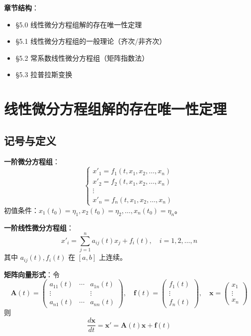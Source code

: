 \textbf{章节结构}：
\begin{itemize}
    \item \S 5.0 线性微分方程组解的存在唯一性定理
    \item \S 5.1 线性微分方程组的一般理论（齐次/非齐次）
    \item \S 5.2 常系数线性微分方程组（矩阵指数法）
    \item \S 5.3 拉普拉斯变换
\end{itemize}

\section{线性微分方程组解的存在唯一性定理}

\subsection{记号与定义}

\textbf{一阶微分方程组}：
$$\begin{cases} x'_1 = f_1(t, x_1, x_2, \ldots, x_n) \\ x'_2 = f_2(t, x_1, x_2, \ldots, x_n) \\ \vdots \\ x'_n = f_n(t, x_1, x_2, \ldots, x_n) \end{cases}$$
初值条件：$x_1(t_0) = \eta_1, x_2(t_0) = \eta_2, \ldots, x_n(t_0) = \eta_n$。

\textbf{一阶线性微分方程组}：
\begin{equation}x'_i = \sum_{j=1}^{n} a_{ij}(t)x_j + f_i(t), \quad i = 1, 2, \ldots, n \tag{5.1}\end{equation}
其中 $a_{ij}(t), f_i(t)$ 在 $[a,b]$ 上连续。

\textbf{矩阵向量形式}：令
$$\mathbf{A}(t) = \begin{pmatrix} a_{11}(t) & \cdots & a_{1n}(t) \\ \vdots & & \vdots \\ a_{n1}(t) & \cdots & a_{nn}(t) \end{pmatrix}, \quad \mathbf{f}(t) = \begin{pmatrix} f_1(t) \\ \vdots \\ f_n(t) \end{pmatrix}, \quad \mathbf{x} = \begin{pmatrix} x_1 \\ \vdots \\ x_n \end{pmatrix}$$
则
\begin{equation}\frac{d\mathbf{x}}{dt} = \mathbf{x}' = \mathbf{A}(t)\mathbf{x} + \mathbf{f}(t) \tag{5.4}\end{equation}

